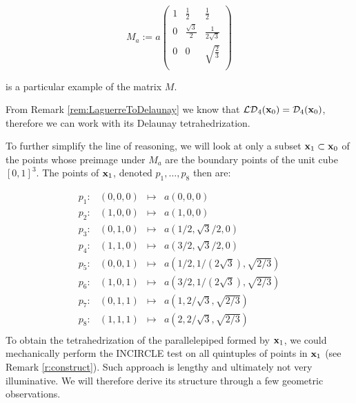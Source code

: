 $$
M_a := a \begin{pmatrix}
1 & \frac 12 & \frac 12 \\
0 & \frac {\sqrt{3}}2 & \frac 1{2\sqrt{3}}  \\
0 & 0 & \sqrt{\frac 23} \\
\end{pmatrix}
$$

is a particular example of the matrix $M$. \newline

\noindent From Remark \ref{rem:LaguerreToDelaunay} we know that $\mathcal {LD}_4({\mathbf{x}}_0) = \mathcal D_4({\mathbf{x}}_0)$, therefore we can work with its Delaunay tetrahedrization.

To further simplify the line of reasoning, we will look at only a subset ${\mathbf{x}}_1\subset {\mathbf{x}}_0$ of the points whose preimage under $M_a$ are the boundary points of the unit cube $[0,1]^3$. The points of ${\mathbf{x}}_1$, denoted $p_1, \dots, p_8$ then are:


$$\begin{matrix}
	p_1: & (0,0,0) & \longmapsto & a(0,0,0) \\
	p_2: & (1,0,0) & \longmapsto & a(1,0,0)\\
	p_3: & (0,1,0) & \longmapsto & a(1/2,\sqrt{3}/2,0)\\
	p_4: & (1,1,0) & \longmapsto & a(3/2,\sqrt{3}/2,0)\\

	p_5: & (0,0,1) & \longmapsto & a(1/2,1/(2\sqrt{3}),\sqrt{2/3})\\
	p_6: & (1,0,1) & \longmapsto & a(3/2,1/(2\sqrt{3}),\sqrt{2/3})\\
	p_7: & (0,1,1) & \longmapsto & a(1,2/\sqrt3, \sqrt{2/3})\\
	p_8: & (1,1,1) & \longmapsto & a(2,2/\sqrt3, \sqrt{2/3})\\
\end{matrix}$$
To obtain the tetrahedrization of the parallelepiped formed by $\x_1$, we could mechanically perform the INCIRCLE test on all quintuples of points in $\x_1$ (see Remark \ref{r:construct}). Such approach is lengthy and ultimately not very illuminative. We will therefore derive its structure through a few geometric observations.

